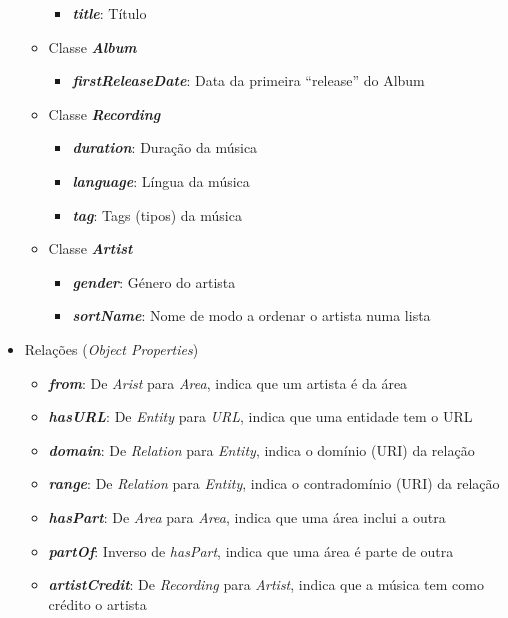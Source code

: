 \documentclass{article}
\begin{document}
\begin{itemize}
\begin{itemize}
\begin{itemize}
            \item \textbf{\textit{title}}: Título
        \end{itemize}
        \item Classe \textbf{\textit{Album}}
        \begin{itemize}
            \item \textbf{\textit{firstReleaseDate}}: Data da primeira ``release'' do Album
        \end{itemize}
        \item Classe \textbf{\textit{Recording}}
        \begin{itemize}
            \item \textbf{\textit{duration}}: Duração da música
            \item \textbf{\textit{language}}: Língua da música
            \item \textbf{\textit{tag}}: Tags (tipos) da música
        \end{itemize}
        \item Classe \textbf{\textit{Artist}}
        \begin{itemize}
            \item \textbf{\textit{gender}}: Género do artista
            \item \textbf{\textit{sortName}}: Nome de modo a ordenar o artista numa lista
        \end{itemize}
    \end{itemize}
    \item Relações (\textit{Object Properties})
    \begin{itemize}
        \item \textbf{\textit{from}}: De \textit{Arist} para \textit{Area}, indica que um artista é da área
        \item \textbf{\textit{hasURL}}: De \textit{Entity} para \textit{URL}, indica que uma entidade tem o URL
        \item \textbf{\textit{domain}}: De \textit{Relation} para \textit{Entity}, indica o domínio (URI) da relação
        \item \textbf{\textit{range}}: De \textit{Relation} para \textit{Entity}, indica o contradomínio (URI) da relação
        \item \textbf{\textit{hasPart}}: De \textit{Area} para \textit{Area}, indica que uma área inclui a outra
        \item \textbf{\textit{partOf}}: Inverso de \textit{hasPart}, indica que uma área é parte de outra
        \item \textbf{\textit{artistCredit}}: De \textit{Recording} para \textit{Artist}, indica que a música tem como crédito o artista

\end{itemize}
\end{itemize}
\end{document}

